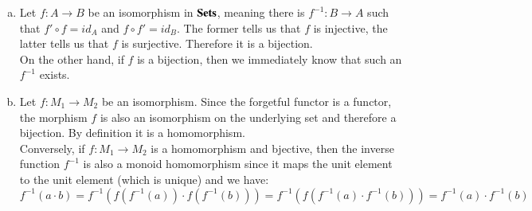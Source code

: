 \documentclass{scrartcl}
\begin{document}
    \begin{enumerate}[(a)]
        \item Let $f : A → B$ be an isomorphism in $\text{\bf Sets}$, meaning there is $f^{-1} : B → A$ such that $f' \circ f = id_A$ and $f \circ f' = id_B$. The former tells us that $f$ is injective, the latter tells us that $f$ is surjective. Therefore it is a bijection.\\
        On the other hand, if $f$ is a bijection, then we immediately know that such an $f^{-1}$ exists.
        
        \item Let $f: M_1 → M_2$ be an isomorphism. Since the forgetful functor is a functor, the morphism $f$ is also an isomorphism on the underlying set and therefore a bijection. By definition it is a homomorphism.\\
        Conversely, if $f : M_1 → M_2$ is a homomorphism and bjective, then the inverse function $f^{-1}$ is also a monoid homomorphism since it maps the unit element to the unit element (which is unique) and we have:
        \[ f^{-1}(a \cdot b) = f^{-1}(f(f^{-1}(a)) \cdot f(f^{-1}(b))) = f^{-1}(f(f^{-1}(a) \cdot f^{-1}(b))) = f^{-1}(a) \cdot f^{-1}(b) \]
    \end{enumerate}
\end{document}
